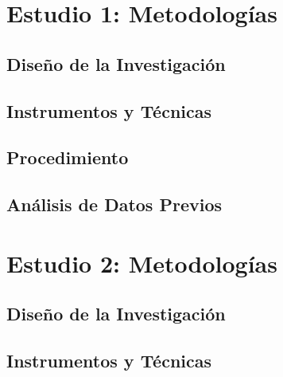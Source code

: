\section{Estudio 1: Metodologías}
\subsection{Diseño de la Investigación}
\subsection{Instrumentos y Técnicas}
\subsection{Procedimiento}
\subsection{Análisis de Datos Previos}


\section{Estudio 2: Metodologías }
\subsection{Diseño de la Investigación}
\subsection{Instrumentos y Técnicas}
